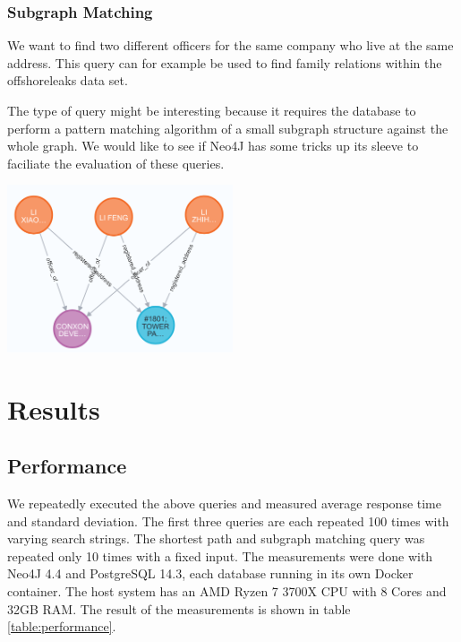 \documentclass[11pt, a4paper,oneside,chapterprefix=false]{scrbook}
\begin{document}
\subsection{Subgraph Matching}

We want to find two different officers for the same company who live at the same address.
This query can for example be used to find family relations within the offshoreleaks data set.

The type of query might be interesting because it requires the database to perform a pattern matching algorithm of a small subgraph structure against the whole graph.
We would like to see if Neo4J has some tricks up its sleeve to faciliate the evaluation of these queries.

\begin{center}
\includegraphics*[width=0.5\textwidth]{figures/query_relation.png}
\end{center}

\chapter{Results} \label{chp:results}

\section{Performance}

We repeatedly executed the above queries and measured average response time and standard deviation.
The first three queries are each repeated 100 times with varying search strings.
The shortest path and subgraph matching query was repeated only 10 times with a fixed input.
The measurements were done with Neo4J 4.4 and PostgreSQL 14.3, each database running in its own Docker container.
The host system has an AMD Ryzen 7 3700X CPU with 8 Cores and 32GB RAM.
The result of the measurements is shown in table \ref{table:performance}.
\end{document}
